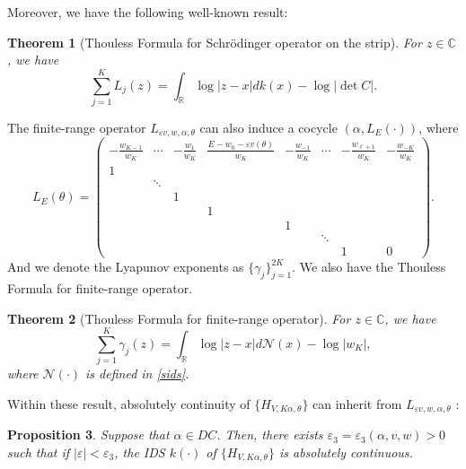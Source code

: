 \documentclass[11pt]{amsart}
\newtheorem{theorem}{Theorem}[section]
\newtheorem{proposition}[theorem]{Proposition}
\theoremstyle{remark}
\theoremstyle{definition}
\begin{document}
Moreover, we have the following well-known result:
\begin{theorem}[Thouless Formula for Schr\"odinger operator on the strip]\cite{CS,KS}
	\label{thouless}
	For  $z \in \mathbb{C}$, we have
	$$
	\sum_{j=1}^{K}L_j(z) = \int_{\mathbb{R}} \log \left|z - x\right| dk(x) - \log |\det C |.
	$$
\end{theorem}

The finite-range operator ${L}_{\varepsilon v,w,\alpha,\theta}$ can also induce a cocycle $(\alpha,L_{E}(\cdot))$, where $$
L_{E}(\theta)=\begin{pmatrix} -\frac{w_{K-1}}{w_{K}} & \cdots & -\frac{w_{1}}{w_{K}} & \frac{E-w_0-\varepsilon v(\theta)}{w_{K}} & -\frac{w_{-1}}{w_{K}} & \cdots & -\frac{w_{\ell+1}}{w_{K}} & -\frac{w_{-K}}{w_{K}} \\ 1 &&&&&&&
\\& \ddots &&&&&&
\\&& 1 &&&&&
\\&&& 1&&&&
\\&&&& 1&&&
\\&&&&& \ddots&&
\\&&&&&& 1& 0
\end{pmatrix}.
$$
And we denote the Lyapunov exponents as $\{\gamma_j\}_{j=1}^{2K}.$
We also have the Thouless Formula for finite-range operator.
\begin{theorem}[Thouless Formula for finite-range  operator]\cite{ Puig}
	\label{thouless1}
	For  $z \in \mathbb{C}$, we have
	$$
	\sum_{j=1}^{K}\gamma_j(z) = \int_{\mathbb{R}} \log \left|z - x\right| d\mathcal{N}(x) - \log |w_K|,
	$$where $\mathcal{N}(\cdot)$ is defined in \eqref{sids}.
\end{theorem}

Within these result, absolutely continuity of $\{H_{V, K\alpha, \theta}\}$ can inherit from ${L}_{\varepsilon v,w,\alpha,\theta}$ :

\begin{proposition}\label{idsac}
Suppose that $\alpha \in DC$. Then, there exists $\varepsilon_3 = \varepsilon_3(\alpha, v, w) > 0$ such that if $|\varepsilon| < \varepsilon_3$, the IDS $k(\cdot)$ of $\{H_{V, K\alpha, \theta}\}$ is absolutely continuous.
\end{proposition}
\end{document}
